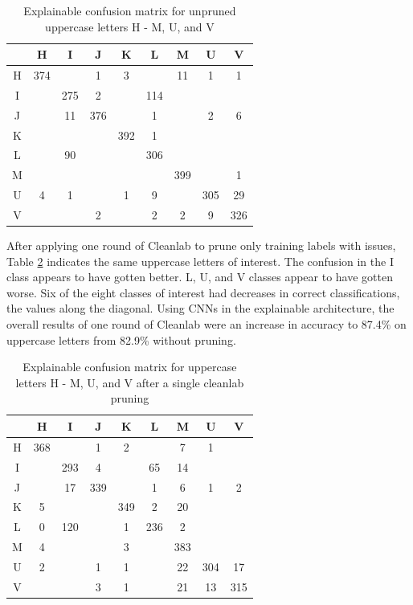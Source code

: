\documentclass[conference]{IEEEtran}
\begin{document}
\begin{table}
    \centering
    \caption{Explainable confusion matrix for unpruned uppercase letters H - M, U, and V}
    \begin{tabular}{ |c|c|c|c|c|c|c|c|c|}
    \hline
     & H & I & J & K & L & M & U & V \\
    \hline
    H & 374 &  & 1 & 3 &  & 11 & 1 & 1 \\
    \hline
    I &  & 275 & 2 & & 114 & & & \\
    \hline
    J &  & 11 & 376 & & 1 & & 2 & 6 \\
    \hline
    K &  &  &  & 392 & 1 & & & \\
    \hline
    L &  & 90 &  &  & 306 & & & \\
    \hline
    M &  &  &  &  &  & 399 & & 1 \\
    \hline
    U & 4 & 1 & & 1 & 9 & & 305 & 29 \\
    \hline
    V & & & 2 & & 2 & 2 & 9 & 326 \\
    \hline
    \end{tabular}
    \label{raw_cap_confusion_matrix}
\end{table}

After applying one round of Cleanlab to prune only training labels with issues,
Table \ref{raw_cap_cleanlab_confusion_matrix} indicates the same uppercase
letters of interest. The confusion in the I class appears to have gotten better.
L, U, and V classes appear to have gotten worse. Six of the eight classes of
interest had decreases in correct classifications, the values along the
diagonal.  Using CNNs in the explainable architecture, the overall results of
one round of Cleanlab were an increase in accuracy to 87.4\% on uppercase
letters from 82.9\% without pruning.

\begin{table}
    \centering
    \caption{Explainable confusion matrix for uppercase letters H - M, U, and V after a single cleanlab pruning}
    \begin{tabular}{ |c|c|c|c|c|c|c|c|c|}
    \hline
    ~ & H & I & J & K & L & M & U & V \\
    \hline
    H & 368 & & 1 & 2 & & 7 & 1 & \\
    \hline
    I &  & 293 & 4 &  & 65 & 14 & & \\
    \hline
    J & & 17 & 339 & & 1 & 6 & 1 & 2 \\
    \hline
    K & 5 &  &  & 349 & 2 & 20 &  & \\
    \hline
    L & 0 & 120 &  & 1 & 236 & 2 & & \\
    \hline
    M & 4 & & & 3 & & 383 & & \\
    \hline
    U & 2 & & 1 & 1 & & 22 & 304 & 17 \\
    \hline
    V & & & 3 & 1 & & 21 & 13 & 315 \\
    \hline
    \end{tabular}
    \label{raw_cap_cleanlab_confusion_matrix}
\end{table}
\end{document}
